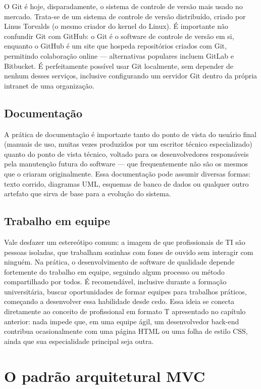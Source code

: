 O Git é hoje, disparadamente, o sistema de controle de versão mais usado no mercado. Trata-se de um sistema de controle de versão distribuído, criado por Linus Torvalds (o mesmo criador do kernel do Linux). É importante não confundir Git com GitHub: o Git é o software de controle de versão em si, enquanto o GitHub é um site que hospeda repositórios criados com Git, permitindo colaboração online — alternativas populares incluem GitLab e Bitbucket. É perfeitamente possível usar Git localmente, sem depender de nenhum desses serviços, inclusive configurando um servidor Git dentro da própria intranet de uma organização.

\subsection{Documentação}

A prática de documentação é importante tanto do ponto de vista do usuário final (manuais de uso, muitas vezes produzidos por um escritor técnico especializado) quanto do ponto de vista técnico, voltado para os desenvolvedores responsáveis pela manutenção futura do software — que frequentemente não são os mesmos que o criaram originalmente. Essa documentação pode assumir diversas formas: texto corrido, diagramas UML, esquemas de banco de dados ou qualquer outro artefato que sirva de base para a evolução do sistema.

\subsection{Trabalho em equipe}

Vale desfazer um estereótipo comum: a imagem de que profissionais de TI são pessoas isoladas, que trabalham sozinhas com fones de ouvido sem interagir com ninguém. Na prática, o desenvolvimento de software de qualidade depende fortemente do trabalho em equipe, seguindo algum processo ou método compartilhado por todos. É recomendável, inclusive durante a formação universitária, buscar oportunidades de formar equipes para trabalhos práticos, começando a desenvolver essa habilidade desde cedo. Essa ideia se conecta diretamente ao conceito de profissional em formato T apresentado no capítulo anterior: nada impede que, em uma equipe ágil, um desenvolvedor back-end contribua ocasionalmente com uma página HTML ou uma folha de estilo CSS, ainda que sua especialidade principal seja outra.

\section{O padrão arquitetural MVC}

